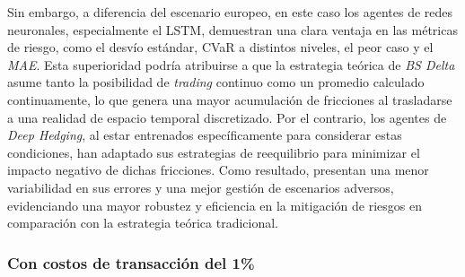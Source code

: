 \documentclass[11pt,a4paper,spanish]{article}
\numberwithin{equation}{section} %
\begin{document}
Sin embargo, a diferencia del escenario europeo, en este caso los agentes de redes neuronales, especialmente el LSTM, demuestran una clara ventaja en las métricas de riesgo, como el desvío estándar, CVaR a distintos niveles, el peor caso y el \textit{MAE}. Esta superioridad podría atribuirse a que la estrategia teórica de \textit{BS Delta} asume tanto la posibilidad de \textit{trading} continuo como un promedio calculado continuamente, lo que genera una mayor acumulación de fricciones al trasladarse a una realidad de espacio temporal discretizado. Por el contrario, los agentes de \textit{Deep Hedging}, al estar entrenados específicamente para considerar estas condiciones, han adaptado sus estrategias de reequilibrio para minimizar el impacto negativo de dichas fricciones. Como resultado, presentan una menor variabilidad en sus errores y una mejor gestión de escenarios adversos, evidenciando una mayor robustez y eficiencia en la mitigación de riesgos en comparación con la estrategia teórica tradicional.



\subsubsection{Con costos de transacción del 1\%}
\end{document}
